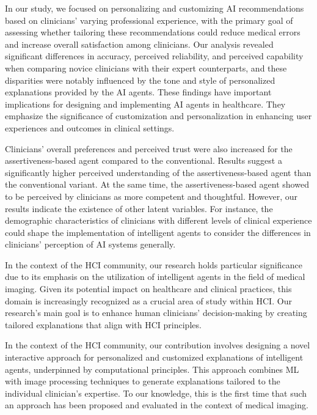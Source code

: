 \textcolor{revised}{In our study, we focused on personalizing and customizing \ac{AI} recommendations based on clinicians' varying professional experience, with the primary goal of assessing whether tailoring these recommendations could reduce medical errors and increase overall satisfaction among clinicians.
Our analysis revealed significant differences in accuracy, perceived reliability, and perceived capability when comparing novice clinicians with their expert counterparts, and these disparities were notably influenced by the tone and style of personalized explanations provided by the \ac{AI} agents.
These findings have important implications for designing and implementing \ac{AI} agents in healthcare.
They emphasize the significance of customization and personalization in enhancing user experiences and outcomes in clinical settings.}

Clinicians' overall preferences and perceived trust were also increased for the assertiveness-based agent compared to the conventional.
Results suggest a significantly higher perceived understanding of the assertiveness-based agent than the conventional variant.
At the same time, the assertiveness-based agent showed to be perceived by clinicians as more competent and thoughtful.
However, our results indicate the existence of other latent variables.
For instance, the demographic characteristics of clinicians with different levels of clinical experience could shape the implementation of intelligent agents to consider the differences in clinicians' perception of \ac{AI} systems generally.

\textcolor{revised}{In the context of the \ac{HCI} community, our research holds particular significance due to its emphasis on the utilization of intelligent agents in the field of medical imaging.
Given its potential impact on healthcare and clinical practices, this domain is increasingly recognized as a crucial area of study within \ac{HCI}.
Our research's main goal is to enhance human clinicians' decision-making by creating tailored explanations that align with \ac{HCI} principles.}

\textcolor{revised}{In the context of the \ac{HCI} community, our contribution involves designing a novel interactive approach for personalized and customized explanations of intelligent agents, underpinned by computational principles.
This approach combines \ac{ML} with image processing techniques to generate explanations tailored to the individual clinician's expertise.
To our knowledge, this is the first time that such an approach has been proposed and evaluated in the context of medical imaging.}

